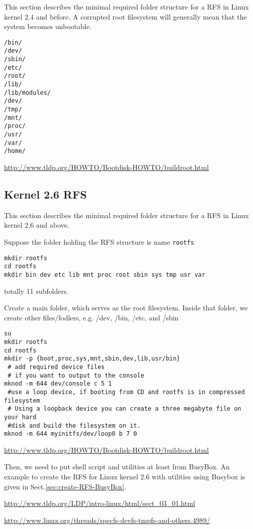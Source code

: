 This section describes the minimal required folder structure for a RFS in Linux
kernel 2.4 and before. A corrupted root filesystem will
generally mean that the system becomes unbootable.
\begin{verbatim}
/bin/
/dev/
/sbin/
/etc/
/root/
/lib/
/lib/modules/
/dev/
/tmp/
/mnt/
/proc/
/usr/
/var/
/home/
\end{verbatim}

\url{http://www.tldp.org/HOWTO/Bootdisk-HOWTO/buildroot.html}

\subsection{Kernel 2.6 RFS}
\label{sec:RFS-Linux-kernel-2.6}

This section describes the minimal required folder structure for a RFS in Linux
kernel 2.6 and above. 

Suppose the folder holding the RFS structure is name
\verb!rootfs!
\begin{verbatim}
mkdir rootfs
cd rootfs
mkdir bin dev etc lib mnt proc root sbin sys tmp usr var
\end{verbatim}
totally 11 subfolders.

Create a main folder, which serves as the root filesystem. Inside that folder,
we create other files/fodlers, e.g. /dev, /bin, /etc, and /sbin
\begin{verbatim}
su
mkdir rootfs 
cd rootfs
mkdir -p {boot,proc,sys,mnt,sbin,dev,lib,usr/bin}
 # add required device files
 # if you want to output to the console
mknod -m 644 dev/console c 5 1
 #use a loop device, if booting from CD and rootfs is in compressed filesystem
 # Using a loopback device you can create a three megabyte file on your hard
 #disk and build the filesystem on it.
mknod -m 644 myinitfs/dev/loop0 b 7 0   	
\end{verbatim}
\url{http://www.tldp.org/HOWTO/Bootdisk-HOWTO/buildroot.html}

Then, we need to put shell script and utilities at least from BusyBox.
An example to create the RFS for Linux kernel 2.6 with utilities using Busybox
is given in Sect.\ref{sec:create-RFS-BusyBox}.

\url{http://www.tldp.org/LDP/intro-linux/html/sect_03_01.html}

% 

\url{http://www.linux.org/threads/specfs-devfs-tmpfs-and-others.4989/}



